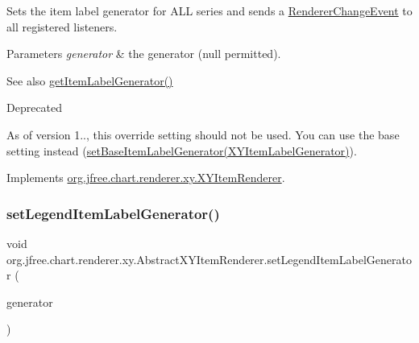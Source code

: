 Sets the item label generator for A\+LL series and sends a \mbox{\hyperlink{}{Renderer\+Change\+Event}} to all registered listeners.


\begin{DoxyParams}{Parameters}
{\em generator} & the generator ({\ttfamily null} permitted).\\
\hline
\end{DoxyParams}
\begin{DoxySeeAlso}{See also}
\mbox{\hyperlink{classorg_1_1jfree_1_1chart_1_1renderer_1_1xy_1_1_abstract_x_y_item_renderer_a729add44689090d1e7df1ce62bffca43}{get\+Item\+Label\+Generator()}}
\end{DoxySeeAlso}
\begin{DoxyRefDesc}{Deprecated}
\item[\mbox{\hyperlink{deprecated__deprecated000201}{Deprecated}}]As of version 1.., this override setting should not be used. You can use the base setting instead (\mbox{\hyperlink{classorg_1_1jfree_1_1chart_1_1renderer_1_1xy_1_1_abstract_x_y_item_renderer_a579128c27e51f1fa12ed95798abfa222}{set\+Base\+Item\+Label\+Generator(\+X\+Y\+Item\+Label\+Generator)}}). \end{DoxyRefDesc}


Implements \mbox{\hyperlink{interfaceorg_1_1jfree_1_1chart_1_1renderer_1_1xy_1_1_x_y_item_renderer_ac0a393bdb421d5fae14a1c5b0a0dc95b}{org.\+jfree.\+chart.\+renderer.\+xy.\+X\+Y\+Item\+Renderer}}.

\mbox{\label{classorg_1_1jfree_1_1chart_1_1renderer_1_1xy_1_1_abstract_x_y_item_renderer_a97f408b8a3a32497f042a33ae4da36a2}} 
\subsubsection{\texorpdfstring{set\+Legend\+Item\+Label\+Generator()}{setLegendItemLabelGenerator()}}
{\footnotesize\ttfamily void org.\+jfree.\+chart.\+renderer.\+xy.\+Abstract\+X\+Y\+Item\+Renderer.\+set\+Legend\+Item\+Label\+Generator (\begin{DoxyParamCaption}\item[{\mbox{\hyperlink{interfaceorg_1_1jfree_1_1chart_1_1labels_1_1_x_y_series_label_generator}{X\+Y\+Series\+Label\+Generator}}}]{generator }\end{DoxyParamCaption})}

